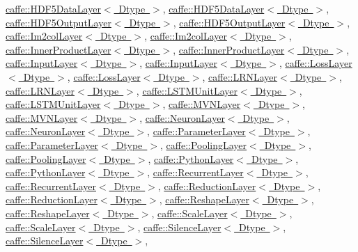 \mbox{\hyperlink{classcaffe_1_1_h_d_f5_data_layer}{caffe\+::\+H\+D\+F5\+Data\+Layer$<$ Dtype $>$}}, \mbox{\hyperlink{classcaffe_1_1_h_d_f5_data_layer}{caffe\+::\+H\+D\+F5\+Data\+Layer$<$ Dtype $>$}}, \mbox{\hyperlink{classcaffe_1_1_h_d_f5_output_layer}{caffe\+::\+H\+D\+F5\+Output\+Layer$<$ Dtype $>$}}, \mbox{\hyperlink{classcaffe_1_1_h_d_f5_output_layer}{caffe\+::\+H\+D\+F5\+Output\+Layer$<$ Dtype $>$}}, \mbox{\hyperlink{classcaffe_1_1_im2col_layer}{caffe\+::\+Im2col\+Layer$<$ Dtype $>$}}, \mbox{\hyperlink{classcaffe_1_1_im2col_layer}{caffe\+::\+Im2col\+Layer$<$ Dtype $>$}}, \mbox{\hyperlink{classcaffe_1_1_inner_product_layer}{caffe\+::\+Inner\+Product\+Layer$<$ Dtype $>$}}, \mbox{\hyperlink{classcaffe_1_1_inner_product_layer}{caffe\+::\+Inner\+Product\+Layer$<$ Dtype $>$}}, \mbox{\hyperlink{classcaffe_1_1_input_layer}{caffe\+::\+Input\+Layer$<$ Dtype $>$}}, \mbox{\hyperlink{classcaffe_1_1_input_layer}{caffe\+::\+Input\+Layer$<$ Dtype $>$}}, \mbox{\hyperlink{classcaffe_1_1_loss_layer}{caffe\+::\+Loss\+Layer$<$ Dtype $>$}}, \mbox{\hyperlink{classcaffe_1_1_loss_layer}{caffe\+::\+Loss\+Layer$<$ Dtype $>$}}, \mbox{\hyperlink{classcaffe_1_1_l_r_n_layer}{caffe\+::\+L\+R\+N\+Layer$<$ Dtype $>$}}, \mbox{\hyperlink{classcaffe_1_1_l_r_n_layer}{caffe\+::\+L\+R\+N\+Layer$<$ Dtype $>$}}, \mbox{\hyperlink{classcaffe_1_1_l_s_t_m_unit_layer}{caffe\+::\+L\+S\+T\+M\+Unit\+Layer$<$ Dtype $>$}}, \mbox{\hyperlink{classcaffe_1_1_l_s_t_m_unit_layer}{caffe\+::\+L\+S\+T\+M\+Unit\+Layer$<$ Dtype $>$}}, \mbox{\hyperlink{classcaffe_1_1_m_v_n_layer}{caffe\+::\+M\+V\+N\+Layer$<$ Dtype $>$}}, \mbox{\hyperlink{classcaffe_1_1_m_v_n_layer}{caffe\+::\+M\+V\+N\+Layer$<$ Dtype $>$}}, \mbox{\hyperlink{classcaffe_1_1_neuron_layer}{caffe\+::\+Neuron\+Layer$<$ Dtype $>$}}, \mbox{\hyperlink{classcaffe_1_1_neuron_layer}{caffe\+::\+Neuron\+Layer$<$ Dtype $>$}}, \mbox{\hyperlink{classcaffe_1_1_parameter_layer}{caffe\+::\+Parameter\+Layer$<$ Dtype $>$}}, \mbox{\hyperlink{classcaffe_1_1_parameter_layer}{caffe\+::\+Parameter\+Layer$<$ Dtype $>$}}, \mbox{\hyperlink{classcaffe_1_1_pooling_layer}{caffe\+::\+Pooling\+Layer$<$ Dtype $>$}}, \mbox{\hyperlink{classcaffe_1_1_pooling_layer}{caffe\+::\+Pooling\+Layer$<$ Dtype $>$}}, \mbox{\hyperlink{classcaffe_1_1_python_layer}{caffe\+::\+Python\+Layer$<$ Dtype $>$}}, \mbox{\hyperlink{classcaffe_1_1_python_layer}{caffe\+::\+Python\+Layer$<$ Dtype $>$}}, \mbox{\hyperlink{classcaffe_1_1_recurrent_layer}{caffe\+::\+Recurrent\+Layer$<$ Dtype $>$}}, \mbox{\hyperlink{classcaffe_1_1_recurrent_layer}{caffe\+::\+Recurrent\+Layer$<$ Dtype $>$}}, \mbox{\hyperlink{classcaffe_1_1_reduction_layer}{caffe\+::\+Reduction\+Layer$<$ Dtype $>$}}, \mbox{\hyperlink{classcaffe_1_1_reduction_layer}{caffe\+::\+Reduction\+Layer$<$ Dtype $>$}}, \mbox{\hyperlink{classcaffe_1_1_reshape_layer}{caffe\+::\+Reshape\+Layer$<$ Dtype $>$}}, \mbox{\hyperlink{classcaffe_1_1_reshape_layer}{caffe\+::\+Reshape\+Layer$<$ Dtype $>$}}, \mbox{\hyperlink{classcaffe_1_1_scale_layer}{caffe\+::\+Scale\+Layer$<$ Dtype $>$}}, \mbox{\hyperlink{classcaffe_1_1_scale_layer}{caffe\+::\+Scale\+Layer$<$ Dtype $>$}}, \mbox{\hyperlink{classcaffe_1_1_silence_layer}{caffe\+::\+Silence\+Layer$<$ Dtype $>$}}, \mbox{\hyperlink{classcaffe_1_1_silence_layer}{caffe\+::\+Silence\+Layer$<$ Dtype $>$}}, 